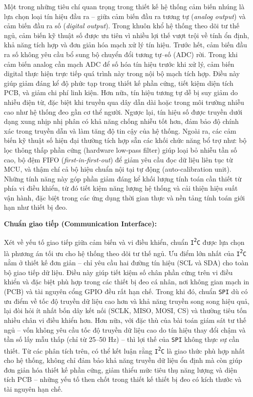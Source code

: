 Một trong những tiêu chí quan trọng trong thiết kế hệ thống cảm biến 
nhúng là lựa chọn loại tín hiệu đầu ra – giữa cảm biến đầu ra 
tương tự (\textit{analog output}) và cảm biến đầu ra số 
(\textit{digital output}). Trong khuôn khổ hệ thống theo dõi tư 
thế ngủ, cảm biến kỹ thuật số được ưu tiên vì nhiều lợi thế vượt 
trội về tính ổn định, khả năng tích hợp và đơn giản hóa mạch xử 
lý tín hiệu.
Trước hết, cảm biến đầu ra số không yêu cầu bổ sung bộ chuyển 
đổi tương tự–số (ADC) rời. Trong khi cảm biến analog cần mạch 
ADC để số hóa tín hiệu trước khi xử lý, cảm biến digital thực 
hiện trực tiếp quá trình này trong nội bộ mạch tích hợp. 
Điều này giúp giảm đáng kể độ phức tạp trong thiết kế phần cứng, 
tiết kiệm diện tích PCB, và giảm chi phí linh kiện.
Hơn nữa, tín hiệu tương tự dễ bị suy giảm do nhiễu điện từ, 
đặc biệt khi truyền qua dây dẫn dài hoặc trong môi trường nhiễu 
cao như hệ thống đeo gần cơ thể người. Ngược lại, 
tín hiệu số được truyền dưới dạng xung nhịp nhị phân có khả 
năng chống nhiễu tốt hơn, đảm bảo độ chính xác trong truyền 
dẫn và làm tăng độ tin cậy của hệ thống.
Ngoài ra, các cảm biến kỹ thuật số hiện đại thường tích hợp sẵn 
các khối chức năng bổ trợ như: bộ lọc thông thấp phần cứng 
(hardware low-pass filter) giúp loại bỏ nhiễu tần số cao, 
bộ đệm FIFO (\textit{first-in-first-out}) để giảm yêu cầu đọc 
dữ liệu liên tục từ MCU, và thậm chí cả bộ hiệu chuẩn nội tại 
tự động (auto-calibration unit). 
Những tính năng này góp phần giảm đáng kể khối lượng tính 
toán cần thiết từ phía vi điều khiển, từ đó tiết kiệm năng 
lượng hệ thống và cải thiện hiệu suất vận hành, đặc biệt trong 
các ứng dụng thời gian thực và nền tảng tính toán giới hạn như 
thiết bị đeo.


\textbf{Chuẩn giao tiếp (Communication Interface):}

Xét về yếu tố giao tiếp giữa cảm biến và vi điều khiển, chuẩn \texttt{I\textsuperscript{2}C} được lựa chọn là phương án tối ưu cho hệ thống theo dõi tư thế ngủ. Ưu điểm lớn nhất của \texttt{I\textsuperscript{2}C} nằm ở thiết kế đơn giản – chỉ yêu cầu hai đường tín hiệu (SCL và SDA) cho toàn bộ giao tiếp dữ liệu. Điều này giúp tiết kiệm số chân phần cứng trên vi điều khiển và đặc biệt phù hợp trong các thiết bị đeo cá nhân, nơi không gian mạch in (PCB) và tài nguyên cổng GPIO đều rất hạn chế.
Trong khi đó, chuẩn \texttt{SPI} dù có ưu điểm về tốc độ truyền dữ liệu cao hơn và khả năng truyền song song hiệu quả, lại đòi hỏi ít nhất bốn dây kết nối (SCLK, MISO, MOSI, CS) và thường tiêu tốn nhiều chân vi điều khiển hơn. Hơn nữa, với đặc thù của bài toán giám sát tư thế ngủ – vốn không yêu cầu tốc độ truyền dữ liệu cao do tín hiệu thay đổi chậm và tần số lấy mẫu thấp (chỉ từ 25–50 Hz) – thì lợi thế của \texttt{SPI} không thực sự cần thiết.
Từ các phân tích trên, có thể kết luận rằng \texttt{I\textsuperscript{2}C} là giao thức phù hợp nhất cho hệ thống, không chỉ đảm bảo khả năng truyền dữ liệu ổn định mà còn giúp đơn giản hóa thiết kế phần cứng, giảm thiểu mức tiêu thụ năng lượng và diện tích PCB – những yếu tố then chốt trong thiết kế thiết bị đeo có kích thước và tài nguyên hạn chế.

